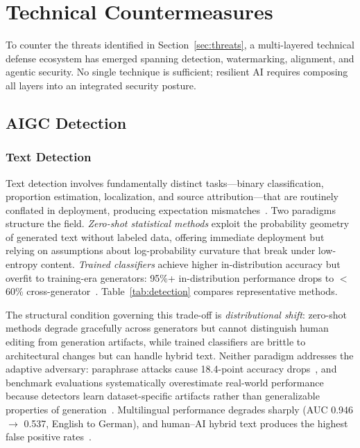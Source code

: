 
\section{Technical Countermeasures}
\label{sec:countermeasures}

To counter the threats identified in Section~\ref{sec:threats}, a multi-layered technical defense ecosystem has emerged spanning detection, watermarking, alignment, and agentic security. No single technique is sufficient; resilient AI requires composing all layers into an integrated security posture.


\subsection{AIGC Detection}
\label{sec:detect}

\subsubsection{Text Detection}
\label{sec:detect-text}

Text detection involves fundamentally distinct tasks---binary classification, proportion estimation, localization, and source attribution---that are routinely conflated in deployment, producing expectation mismatches~\cite{dugan2024raid}. Two paradigms structure the field. \emph{Zero-shot statistical methods} exploit the probability geometry of generated text without labeled data, offering immediate deployment but relying on assumptions about log-probability curvature that break under low-entropy content. \emph{Trained classifiers} achieve higher in-distribution accuracy but overfit to training-era generators: 95\%+ in-distribution performance drops to $<$60\% cross-generator~\cite{macko2023multitude}. Table~\ref{tab:detection} compares representative methods.

The structural condition governing this trade-off is \emph{distributional shift}: zero-shot methods degrade gracefully across generators but cannot distinguish human editing from generation artifacts, while trained classifiers are brittle to architectural changes but can handle hybrid text. Neither paradigm addresses the adaptive adversary: paraphrase attacks cause 18.4-point accuracy drops~\cite{dugan2024raid}, and benchmark evaluations systematically overestimate real-world performance because detectors learn dataset-specific artifacts rather than generalizable properties of generation~\cite{macko2023multitude}. Multilingual performance degrades sharply (AUC 0.946 $\to$ 0.537, English to German), and human--AI hybrid text produces the highest false positive rates~\cite{turnitin2024}.

